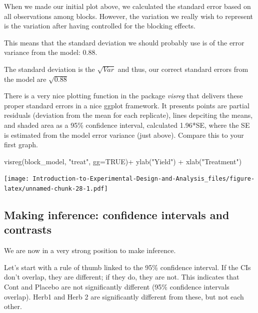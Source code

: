 \documentclass[
]{book}
\newenvironment{Shaded}{\begin{snugshade}}{\end{snugshade}}
\newcommand{\AttributeTok}[1]{\textcolor[rgb]{0.77,0.63,0.00}{#1}}
\newcommand{\ConstantTok}[1]{\textcolor[rgb]{0.00,0.00,0.00}{#1}}
\newcommand{\FunctionTok}[1]{\textcolor[rgb]{0.00,0.00,0.00}{#1}}
\newcommand{\NormalTok}[1]{#1}
\newcommand{\SpecialCharTok}[1]{\textcolor[rgb]{0.00,0.00,0.00}{#1}}
\newcommand{\StringTok}[1]{\textcolor[rgb]{0.31,0.60,0.02}{#1}}
\begin{document}
When we made our initial plot above, we calculated the standard error based on all observations among blocks. However, the variation we really wish to represent is the variation after having controlled for the blocking effects.

This means that the standard deviation we should probably use is of the error variance from the model: \(0.88\).

The standard deviation is the \(\sqrt{Var}\) and thus, our correct standard errors from the model are \(\sqrt{0.88}\)

There is a very nice plotting function in the package \emph{visreg} that delivers these proper standard errors in a nice ggplot framework. It presents points are partial residuals (deviation from the mean for each replicate), lines depciting the means, and shaded area as a 95\% confidence interval, calculated 1.96*SE, where the SE is estimated from the model error variance (just above). Compare this to your first graph.

\begin{Shaded}
\begin{Highlighting}[]
\FunctionTok{visreg}\NormalTok{(block\_model, }\StringTok{"treat"}\NormalTok{, }\AttributeTok{gg=}\ConstantTok{TRUE}\NormalTok{)}\SpecialCharTok{+}
  \FunctionTok{ylab}\NormalTok{(}\StringTok{"Yield"}\NormalTok{) }\SpecialCharTok{+} 
  \FunctionTok{xlab}\NormalTok{(}\StringTok{"Treatment"}\NormalTok{) }
\end{Highlighting}
\end{Shaded}

\texttt{[image: Introduction-to-Experimental-Design-and-Analysis\_files/figure-latex/unnamed-chunk-28-1.pdf]}

\hypertarget{making-inference-confidence-intervals-and-contrasts}{%
\subsection{Making inference: confidence intervals and contrasts}\label{making-inference-confidence-intervals-and-contrasts}}

We are now in a very strong position to make inference.

Let's start with a rule of thumb linked to the 95\% confidence interval. If the CIs don't overlap, they are different; if they do, they are not. This indicates that Cont and Placebo are not significantly different (95\% confidence intervals overlap). Herb1 and Herb 2 are significantly different from these, but not each other.
\end{document}
